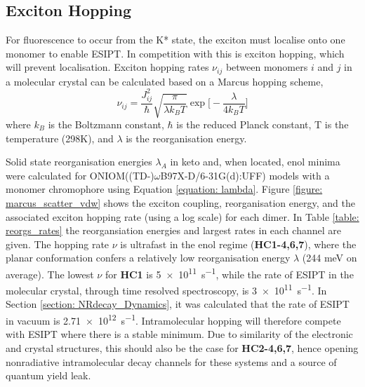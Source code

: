 \subsection{Exciton Hopping}\label{section: Connecting_Marcus}
For fluorescence to occur from the K* state, the exciton must localise onto one monomer to enable ESIPT. In competition with this is exciton hopping, which will prevent localisation. Exciton hopping rates $\nu_{ij}$ between monomers $i$ and $j$ in a molecular crystal can be calculated based on a Marcus hopping scheme,\cite{Stehr2014,Bruckner2016,Kimura2000,Bredas2004} 
\begin{equation}
\nu_{ij}=\frac{J_{ij}^2}{\hbar}\sqrt{\frac{\pi}{\lambda k_{B}T}}\exp\bigg[-\frac{\lambda}{4k_{B}T}\bigg]
\label{equation: marcus}
\end{equation}
where $k_{B}$ is the Boltzmann constant, $\hbar$ is the reduced Planck
constant, T is the temperature (298K), and $\lambda$ is the reorganisation energy.

Solid state reorganisation energies $\lambda_{A}$ in keto and, when located, enol minima were calculated for ONIOM((TD-)$\omega$B97X-D/6-31G(d):UFF) models with a monomer chromophore using Equation \ref{equation: lambda}. Figure \ref{figure: marcus_scatter_vdw} shows the exciton coupling, reorganisation energy, and the associated exciton hopping rate (using a log scale) for each dimer. In Table \ref{table: reorgs_rates} the reorgansiation energies and largest rates in each channel are given. The hopping rate $\nu$ is ultrafast in the enol regime (\textbf{HC1-4,6,7}), where the planar conformation confers a relatively low reorganisation energy $\lambda$ (244 meV on average). The lowest $\nu$ for \textbf{HC1} is \SI{5e11}{s^{-1}}, while the rate of ESIPT in the molecular crystal, through time resolved spectroscopy, is \SI{3e11}{s^{-1}}.\cite{Zahid2017} In Section \ref{section: NRdecay_Dynamics}, it was calculated that the rate of ESIPT in vacuum is \SI{2.71e12}{s^{-1}}. Intramolecular hopping will therefore compete with ESIPT where there is a stable \Estar{} minimum. Due to similarity of the electronic and crystal structures, this should also be the case for \textbf{HC2-4,6,7}, hence opening nonradiative intramolecular decay channels for these systems and a source of quantum yield leak.

